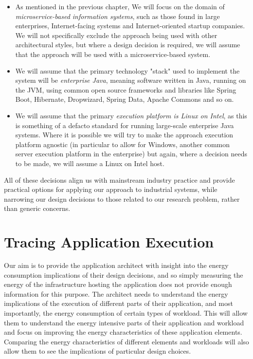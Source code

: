 \begin{itemize}
	\item As mentioned in the previous chapter, We will focus on the domain of \emph{microservice-based information systems}, such as those found in large enterprises, Internet-facing systems and Internet-oriented startup companies.  We will not specifically exclude the approach being used with other architectural styles, but where a design decision is required, we will assume that the approach will be used with a microservice-based system.
	\item We will assume that the primary technology "stack" used to implement the system will be \emph{enterprise Java}, meaning software written in Java, running on the JVM, using common open source frameworks and libraries like Spring Boot, Hibernate, Dropwizard, Spring Data, Apache Commons and so on.
	\item We will assume that the primary \emph{execution platform is Linux on Intel}, as this is something of a defacto standard for running large-scale enterprise Java systems.  Where it is possible we will try to make the approach execution platform agnostic (in particular to allow for Windows, another common server execution platform in the enterprise) but again, where a decision needs to be made, we will assume a Linux on Intel host.
\end{itemize}

All of these decisions align us with mainstream industry practice and provide practical options for applying our approach to industrial systems, while narrowing our design decisions to those related to our research problem, rather than generic concerns.

\section{Tracing Application Execution}

Our aim is to provide the application architect with insight into the energy consumption implications of their design decisions, and so simply measuring the energy of the infrastructure hosting the application does not provide enough information for this purpose.  The architect needs to understand the energy implications of the execution of different parts of their application, and most importantly, the energy consumption of certain types of workload.  This will allow them to understand the energy intensive parts of their application and workload and focus on improving the energy characteristics of these application elements.  Comparing the energy characteristics of different elements and workloads will also allow them to see the implications of particular design choices.

